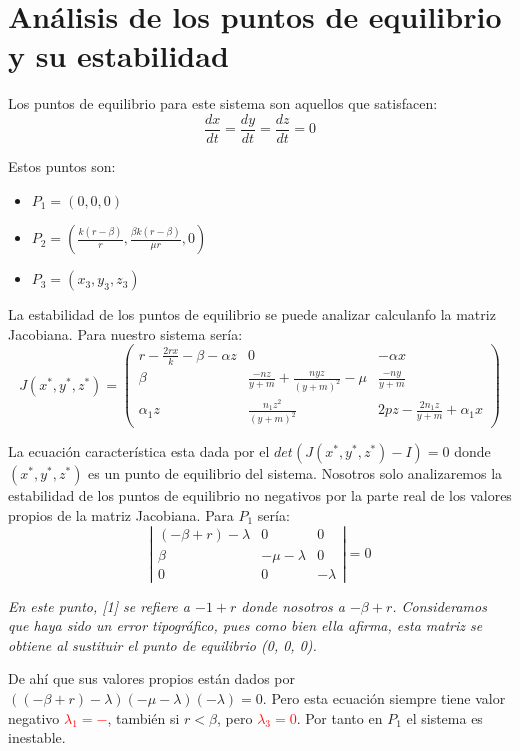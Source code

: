 \documentclass{wscpaperproc}
\theoremstyle{wsc}
\begin{document}
\section*{Análisis de los puntos de equilibrio y su estabilidad}

Los puntos de equilibrio para este sistema son aquellos que satisfacen:
$$\frac{dx}{dt}=\frac{dy}{dt}=\frac{dz}{dt}=0$$

Estos puntos son:
\begin{itemize}
	\item $P_1=(0, 0, 0)$
	\item $P_2=(\frac{k(r-\beta)}{r}, \frac{\beta k(r-\beta)}{\mu r}, 0)$
	\item $P_3=(x_3, y_3, z_3)$
\end{itemize}

La estabilidad de los puntos de equilibrio se puede analizar calculanfo la matriz Jacobiana. Para nuestro sistema sería:
$$ J(x^*, y^*, z^*) = \left(
	\begin{array}{ccc}
			r-\frac{2rx}{k}-\beta-\alpha z & 0                                       & -\alpha x                       \\
			\beta                          & \frac{-nz}{y+m}+\frac{nyz}{(y+m)^2}-\mu & \frac{-ny}{y+m}                 \\
			\alpha_1z                      & \frac{n_1z^2}{(y+m)^2}                  & 2pz-\frac{2n_1z}{y+m}+\alpha_1x
		\end{array}
	\right)$$

La ecuación característica esta dada por el $det(J(x^*, y^*, z^*)-I)=0$ donde $(x^*, y^*, z^*)$ es un punto de equilibrio del sistema.
Nosotros solo analizaremos la estabilidad de los puntos de equilibrio no negativos por la parte real de los valores propios de la matriz Jacobiana.
\vspace*{0.5cm}
Para $P_1$ sería:
$$\left|
	\begin{array}{ccc}
		(-\beta+r)-\lambda & 0            & 0        \\
		\beta              & -\mu-\lambda & 0        \\
		0                  & 0            & -\lambda
	\end{array}
	\right| =0$$

{\it En este punto, [1] se refiere a $-1+r$ donde nosotros a $-\beta+r$. Consideramos que haya sido un error tipográfico, pues como bien ella
		afirma, esta matriz se obtiene al sustituir el punto de equilibrio (0, 0, 0).}


De ahí que sus valores propios están dados por $((-\beta+r)-\lambda)(-\mu-\lambda)(-\lambda)=0$. Pero esta ecuación siempre tiene valor negativo
\textcolor{red}{$\lambda_1=-$}, también si $r<\beta$, pero \textcolor{red}{$\lambda_3=0$}. Por tanto en $P_1$ el sistema es inestable.
\end{document}

